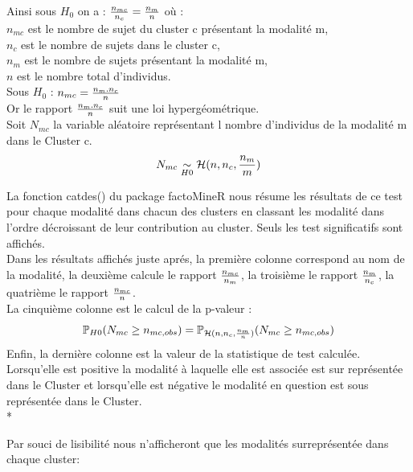 \documentclass{book}
\begin{document}
\noindent
Ainsi sous $H_0$ on a : 
${{n_{mc}} \over {n_c}} = {{n_m} \over {n}} $ où :\\
$n_{mc}$ est le nombre de sujet du cluster c présentant la modalité m,\\
$n_c$ est le nombre de sujets dans le cluster c,\\
$n_m$ est le nombre de sujets présentant la modalité m,\\
$n$ est le nombre total d'individus.\\
	
\noindent
Sous $H_0$ : $n_{mc}  = {n_m . n_c \over {n}} $\\
Or le rapport ${n_m . n_c \over {n}} $ suit une loi hypergéométrique.\\
Soit $N_{mc}$ la variable aléatoire représentant l nombre d'individus de la modalité m dans le Cluster c.
\begin{equation}
 N_{mc} \underset{H0}{\sim} \mathcal{H}(n, n_c, {{n_m}\over {m}})
\end{equation}

\noindent
La fonction catdes() du package factoMineR nous résume les résultats de ce test pour chaque modalité dans chacun des clusters en classant les modalité dans l'ordre décroissant de leur contribution au cluster.
Seuls les test significatifs sont affichés.\\

\noindent
Dans les résultats affichés juste aprés, la première colonne correspond au nom de la modalité, la deuxième calcule le rapport $n_{mc} \over n_m$, la troisième le rapport $n_m \over n_c$, la quatrième le rapport $n_{mc} \over n$.\\
La cinquième colonne est le calcul de la p-valeur :\\
\begin{equation}
\mathbb{P}_{H0}(N_{mc} \geq n_{mc, obs}) =  \mathbb{P}_{\mathcal{H}(n, n_c, {n_m \over n})}(N_{mc} \geq n_{mc, obs})
\end{equation} 
Enfin, la dernière colonne est la valeur de la statistique de test calculée. Lorsqu'elle est positive la modalité à laquelle elle est associée est sur représentée dans le Cluster et lorsqu'elle est négative le modalité en question est sous représentée dans le Cluster.\\*

\noindent
Par souci de lisibilité nous n'afficheront que les modalités surreprésentée dans chaque cluster:
\end{document}
